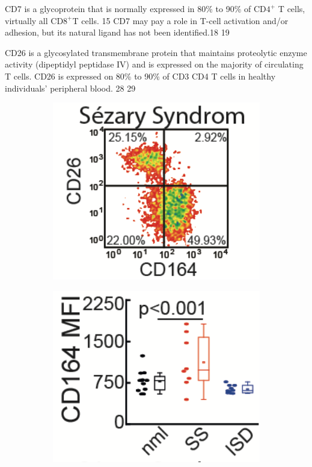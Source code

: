 CD7 is a glycoprotein that is normally expressed in 80\% to 90\% of CD$4 ^{+}$ T cells, virtually all CD$8 ^{+}$T  cells. 15  CD7 may pay a role in T-cell activation and/or adhesion, but its natural ligand has not been identified.18 19



CD26 is a glycosylated transmembrane protein that maintains proteolytic enzyme activity (dipeptidyl peptidase IV) and is expressed on the
majority of circulating T cells.  CD26 is expressed on 80\% to 90\% of CD3 CD4 T cells in healthy individuals' peripheral blood. 28 29

\begin{figure}[t]
	\begin{center}
		\begin{subfigure}[b]{0.49\textwidth}
		    \centering
			\includegraphics[width=\textwidth]{thesis-template-master/images/cd164.png}
			\label{fig:cellnet}
            \caption{}
		\end{subfigure}
        \begin{subfigure}[b]{0.49\textwidth}
		    \centering
			\includegraphics[width=\textwidth]{thesis-template-master/images/sezary and cd164.png}

\end{subfigure}
\end{center}
\end{figure}
